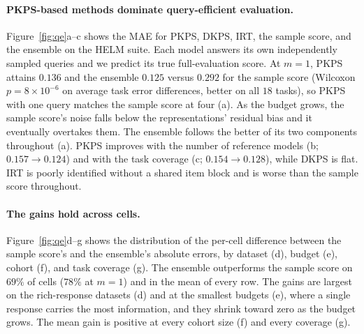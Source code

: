 \documentclass{article}
\theoremstyle{definition}
\theoremstyle{remark}
\theoremstyle{plain}
\newcommand{\PKPS}{PKPS\xspace}
\begin{document}

\paragraph{\PKPS-based methods dominate query-efficient evaluation.}
Figure~\ref{fig:qe}a--c shows the MAE for \PKPS, DKPS, IRT, the sample score, and
the ensemble on the HELM suite.
Each model answers its own independently sampled queries and we predict its true
full-evaluation score.
At $m{=}1$, \PKPS attains $0.136$ and the ensemble $0.125$ versus $0.292$ for the sample score (Wilcoxon $p{=}8\times10^{-6}$ on average task error differences, better on all $18$ tasks), so \PKPS with one query matches the sample score at four (a).
As the budget grows, the sample score's noise falls below the representations'
residual bias and it eventually overtakes them.
The ensemble follows the better of its two components
throughout (a).
\PKPS improves with the number of reference models
(b; $0.157\!\to\!0.124$) and with the task coverage (c; $0.154\!\to\!0.128$),
while DKPS is flat.
IRT is poorly identified without a shared item block and is worse than the sample
score throughout.

\paragraph{The gains hold across cells.}
Figure~\ref{fig:qe}d--g shows the distribution of the per-cell difference between
the sample score's and the ensemble's absolute errors, by dataset (d), budget (e),
cohort (f), and task coverage (g).
The ensemble outperforms the sample score on $69\%$ of cells ($78\%$ at $m{=}1$)
and in the mean of every row.
The gains are largest on the rich-response datasets (d) and at the smallest budgets
(e), where a single response carries the most information, and they shrink toward
zero as the budget grows.
The mean gain is positive at every cohort size (f) and every coverage (g).
\end{document}
